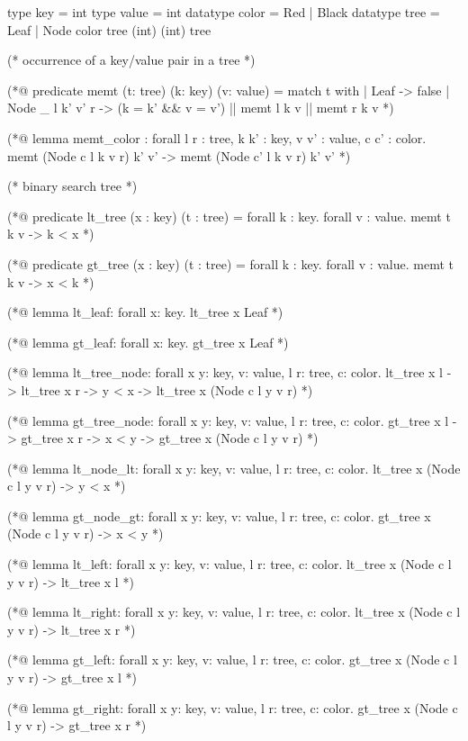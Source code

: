 \begin{cakeml}
type key = int
type value = int
datatype color = Red | Black
datatype tree = Leaf | Node color tree (int) (int) tree

(* occurrence of a key/value pair in a tree *)

(*@ predicate memt (t: tree) (k: key) (v: value) =
    match t with
    | Leaf -> false
    | Node _ l k' v' r -> (k = k' && v = v') || memt l k v || memt r k v *)

(*@ lemma memt_color :
    forall l r : tree, k k' : key, v v' : value, c c' : color.
    memt (Node c l k v r) k' v' -> memt (Node c' l k v r) k' v' *)

(* binary search tree *)

(*@ predicate lt_tree (x : key) (t : tree) =
    forall k : key. forall v : value. memt t k v -> k < x *)

(*@ predicate gt_tree (x : key) (t : tree) =
    forall k : key. forall v : value. memt t k v -> x < k *)

(*@ lemma lt_leaf: forall x: key. lt_tree x Leaf *)

(*@ lemma gt_leaf: forall x: key. gt_tree x Leaf *)

(*@ lemma lt_tree_node:
    forall x y: key, v: value, l r: tree, c: color.
      lt_tree x l -> lt_tree x r -> y < x -> lt_tree x (Node c l y v r) *)

(*@ lemma gt_tree_node:
    forall x y: key, v: value, l r: tree, c: color.
      gt_tree x l -> gt_tree x r -> x < y -> gt_tree x (Node c l y v r) *)

(*@ lemma lt_node_lt:
    forall x y: key, v: value, l r: tree, c: color.
      lt_tree x (Node c l y v r) -> y < x *)

(*@ lemma gt_node_gt:
    forall x y: key, v: value, l r: tree, c: color.
      gt_tree x (Node c l y v r) -> x < y *)

(*@ lemma lt_left:
    forall x y: key, v: value, l r: tree, c: color.
      lt_tree x (Node c l y v r) -> lt_tree x l *)

(*@ lemma lt_right:
    forall x y: key, v: value, l r: tree, c: color.
      lt_tree x (Node c l y v r) -> lt_tree x r *)

(*@ lemma gt_left:
    forall x y: key, v: value, l r: tree, c: color.
      gt_tree x (Node c l y v r) -> gt_tree x l *)

(*@ lemma gt_right:
    forall x y: key, v: value, l r: tree, c: color.
      gt_tree x (Node c l y v r) -> gt_tree x r *)


\end{cakeml}
